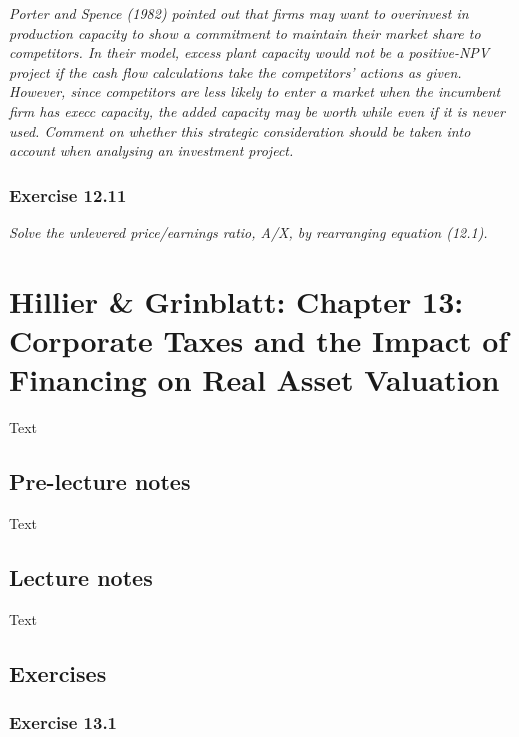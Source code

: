 \documentclass[]{book}
\theoremstyle{definition}
\theoremstyle{definition}
\theoremstyle{remark}
\begin{document}
\emph{Porter and Spence (1982) pointed out that firms may want to
overinvest in production capacity to show a commitment to maintain their
market share to competitors. In their model, excess plant capacity would
not be a positive-NPV project if the cash flow calculations take the
competitors' actions as given. However, since competitors are less
likely to enter a market when the incumbent firm has execc capacity, the
added capacity may be worth while even if it is never used. Comment on
whether this strategic consideration should be taken into account when
analysing an investment project.} \citep[p.426]{book}

\subsection{Exercise 12.11}\label{exercise-12.11}

\emph{Solve the unlevered price/earnings ratio, A/X, by rearranging
equation (12.1).} \citep[p.426]{book}

\chapter{Hillier \& Grinblatt: Chapter 13: Corporate Taxes and the
Impact of Financing on Real Asset
Valuation}\label{hillier-grinblatt-chapter-13-corporate-taxes-and-the-impact-of-financing-on-real-asset-valuation}

Text

\section{Pre-lecture notes}\label{pre-lecture-notes-12}

Text

\section{Lecture notes}\label{lecture-notes-12}

Text

\section{Exercises}\label{exercises-12}

\subsection{Exercise 13.1}\label{exercise-13.1}
\end{document}
